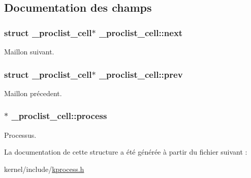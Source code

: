 \subsection{Documentation des champs}
\hypertarget{struct__proclist__cell_a76062c3c8bce7b458ed610e7568c0858}{
\subsubsection[{next}]{\setlength{\rightskip}{0pt plus 5cm}struct {\bf \+\_\+proclist\+\_\+cell}$\ast$ \+\_\+proclist\+\_\+cell\+::next}}\label{struct__proclist__cell_a76062c3c8bce7b458ed610e7568c0858}
Maillon suivant. \hypertarget{struct__proclist__cell_aee5c3bd7595d05c693fe6df63937052e}{
\subsubsection[{prev}]{\setlength{\rightskip}{0pt plus 5cm}struct {\bf \+\_\+proclist\+\_\+cell}$\ast$ \+\_\+proclist\+\_\+cell\+::prev}}\label{struct__proclist__cell_aee5c3bd7595d05c693fe6df63937052e}
Maillon précedent. \hypertarget{struct__proclist__cell_abe320ebc4ea6556f17dd28e93efb6b31}{
\subsubsection[{process}]{$\ast$ \+\_\+proclist\+\_\+cell\+::process}}\label{struct__proclist__cell_abe320ebc4ea6556f17dd28e93efb6b31}
Processus. 

La documentation de cette structure a été générée à partir du fichier suivant \+:\begin{DoxyCompactItemize}
\item 
kernel/include/\hyperlink{kprocess_8h}{kprocess.\+h}\end{DoxyCompactItemize}
